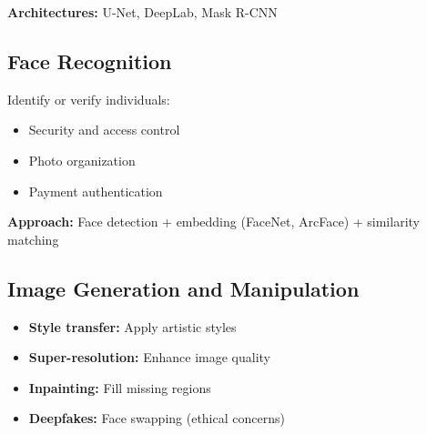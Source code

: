 \textbf{Architectures:} U-Net, DeepLab, Mask R-CNN

\subsection{Face Recognition}

Identify or verify individuals:
\begin{itemize}
    \item Security and access control
    \item Photo organization
    \item Payment authentication
\end{itemize}

\textbf{Approach:} Face detection + embedding (FaceNet, ArcFace) + similarity matching

\subsection{Image Generation and Manipulation}

\begin{itemize}
    \item \textbf{Style transfer:} Apply artistic styles
    \item \textbf{Super-resolution:} Enhance image quality
    \item \textbf{Inpainting:} Fill missing regions
    \item \textbf{Deepfakes:} Face swapping (ethical concerns)
\end{itemize}

